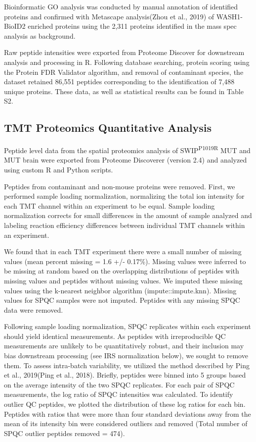 Bioinformatic GO analysis was conducted by manual annotation of identified
proteins and confirmed with Metascape analysis(Zhou et al., 2019) of
WASH1-BioID2 enriched proteins using the 2,311 proteins identified in the mass
spec analysis as background.

Raw peptide intensities were exported from Proteome Discover for downstream
analysis and processing in R. Following database searching, protein scoring
using the Protein FDR Validator algorithm, and removal of contaminant species,
the dataset retained 86,551 peptides corresponding to the identification of
7,488 unique proteins. These data, as well as statistical results can be found
in Table S2.

\subsection{TMT Proteomics Quantitative Analysis}

Peptide level data from the
spatial proteomics analysis of SWIP\textsuperscript{P1019R} MUT and MUT brain
were exported from Proteome Discoverer (version 2.4) and analyzed using custom R
and Python scripts.

Peptides from contaminant and non-mouse proteins were
removed. First, we performed sample loading normalization, normalizing the total
ion intensity for each TMT channel within an experiment to be equal. Sample
loading normalization corrects for small differences in the amount of sample
analyzed and labeling reaction efficiency differences between individual TMT
channels within an experiment.

We found that in each TMT experiment there were a small number of missing values
(mean percent missing = 1.6 +/- 0.17\%). Missing values were inferred to be
missing at random based on the overlapping distributions of peptides with
missing values and peptides without missing values. We imputed these missing
values using the k-nearest neighbor algorithm (impute::impute.knn). Missing
values for SPQC samples were not imputed. Peptides with any missing SPQC data
were removed.

Following sample loading normalization, SPQC replicates within each experiment
should yield identical measurements. As peptides with irreproducible QC
measurements are unlikely to be quantitatively robust, and their inclusion may
bias downstream processing (see IRS normalization below), we sought to remove
them. To assess intra-batch variability, we utilized the method described by
Ping et al., 2019(Ping et al., 2018). Briefly, peptides were binned into 5
groups based on the average intensity of the two SPQC replicates. For each pair
of SPQC measurements, the log ratio of SPQC intensities was calculated. To
identify outlier QC peptides, we plotted the distribution of these log ratios
for each bin. Peptides with ratios that were more than four standard deviations
away from the mean of its intensity bin were considered outliers and removed
(Total number of SPQC outlier peptides removed = 474).


